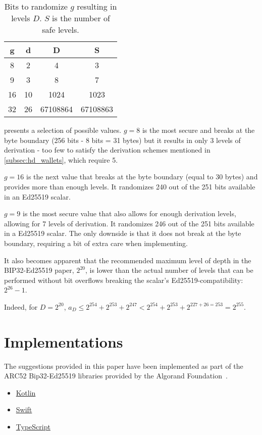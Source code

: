 \documentclass[12pt, a4paper, twocolumn]{article}
\begin{document}
\begin{table}[h]
  \centering
  \begin{tabular}{|c|c|c|c|}
  \hline
  g & d  & D & S  \\
  \hline
  8 & 2 & 4 & 3 \\
  9 & 3 & 8 & 7 \\
  16 & 10 & 1024 & 1023 \\
  32 & 26 & 67108864 & 67108863  \\
  \hline
  \end{tabular}
  \caption{Bits to randomize $g$ resulting in levels $D$. $S$ is the number of safe levels.}
  \label{tab:g_and_d}
\end{table}


 presents a selection of possible values.
$g=8$ is the most secure and breaks at the byte boundary (256 bits - 8 bits = 31 bytes) but it results in only 3 levels of derivation - too few to satisfy the derivation schemes mentioned in \cref{subsec:hd_wallets}, which require 5.

$g=16$ is the next value that breaks at the byte boundary (equal to 30 bytes) and provides more than enough levels. It randomizes 240 out of the 251 bits available in an Ed25519 scalar.

$g=9$ is the most secure value that also allows for enough derivation levels, allowing for 7 levels of derivation. It randomizes 246 out of the 251 bits available in a Ed25519 scalar. The only downside is that it does not break at the byte boundary, requiring a bit of extra care when implementing.

It also becomes apparent that the recommended maximum level of depth in the BIP32-Ed25519 paper, $2^{20}$, is lower than the actual number of levels that can be performed without bit overflows breaking the scalar's Ed25519-compatibility: $2^{26} - 1$.

Indeed, for $D=2^{20}$, $a_{D} \leq 2^{254} + 2^{253} + 2^{247} < 2^{254} + 2^{253} + 2^{227+26=253} = 2^{255}$.


\section{Implementations}


The suggestions provided in this paper have been implemented as part of the ARC52 Bip32-Ed25519 libraries provided by the Algorand Foundation~\cite{AF}.

\begin{itemize}
  \item \href{https://github.com/algorandfoundation/bip32-ed25519-kotlin}{Kotlin}
  \item \href{https://github.com/algorandfoundation/bip32-ed25519-swift}{Swift}
  \item \href{https://github.com/ehanoc/ARCs/tree/wallet-api-context/assets/arc-0052}{TypeScript}
\end{itemize}
\end{document}

